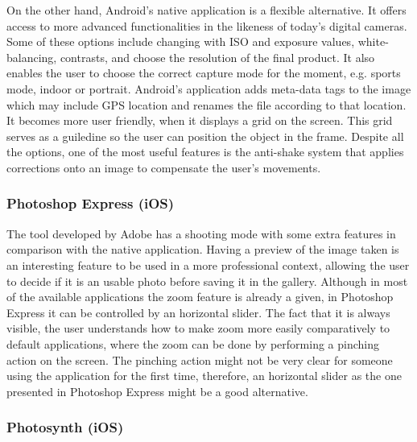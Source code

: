 On the other hand, Android's native application is a flexible alternative. It offers access to more advanced functionalities in the likeness of today's digital cameras.
Some of these options include changing with ISO and exposure values, white-balancing, contrasts, and choose the resolution of the final product. It also enables the user to choose the correct capture mode for the moment, e.g. sports mode, indoor or portrait.
Android's application adds meta-data tags to the image which may include GPS location and renames the file according to that location. It becomes more user friendly, when it displays a grid on the screen. This grid serves as a guiledine so the user can position the object in the frame. Despite all the options, one of the most useful features is the anti-shake system that applies corrections onto an image to compensate the user's movements.

\subsubsection{Photoshop Express (iOS)}

The tool developed by Adobe \cite{Photoshop} has a shooting mode with some extra features in comparison with the native application.
Having a preview of the image taken is an interesting feature to be used in a more professional context, allowing the user to decide if it is an usable photo before saving it in the gallery.
Although in most of the available applications the zoom feature is already a given, in Photoshop Express it can be controlled by an horizontal slider. The fact that it is always visible, the user understands how to make zoom more easily comparatively to default applications, where the zoom can be done by performing a pinching action on the screen. The pinching action might not be very clear for someone using the application for the first time, therefore, an horizontal slider as the one presented in Photoshop Express might be a good alternative.

\subsubsection{Photosynth (iOS)}

